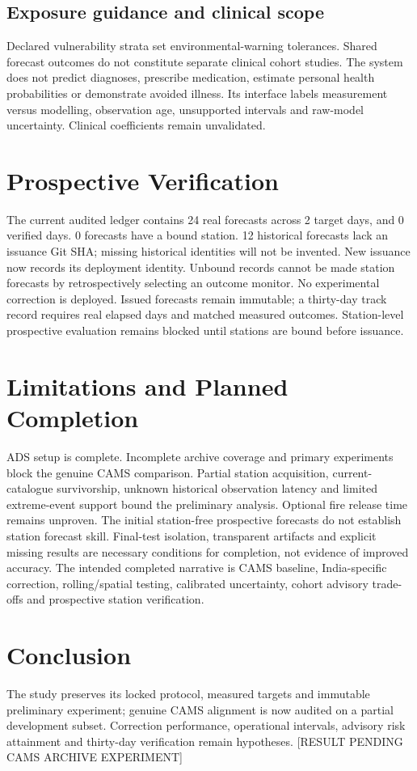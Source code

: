 \documentclass[journal]{IEEEtran}
\begin{document}
\subsection{Exposure guidance and clinical scope}
Declared vulnerability strata set environmental-warning tolerances. Shared
forecast outcomes do not constitute separate clinical cohort studies. The
system does not predict diagnoses, prescribe medication, estimate personal
health probabilities or demonstrate avoided illness. Its interface labels
measurement versus modelling, observation age, unsupported intervals and
raw-model uncertainty. Clinical coefficients remain unvalidated.
\section{Prospective Verification}
The current audited ledger contains 24 real forecasts across 2 target days, and 0 verified days. 0 forecasts have a bound station. 12 historical forecasts lack an issuance Git SHA; missing historical identities will not be invented. New issuance now records its deployment identity. Unbound records cannot be made station forecasts by retrospectively selecting an outcome monitor. No experimental correction is deployed. Issued forecasts remain immutable; a thirty-day track record requires real elapsed days and matched measured outcomes. Station-level prospective evaluation remains blocked until stations are bound before issuance.
\clearpage
\section{Limitations and Planned Completion}
ADS setup is complete. Incomplete archive coverage and primary experiments block the genuine CAMS comparison. Partial station acquisition, current-catalogue survivorship,
unknown historical observation latency and limited extreme-event support bound
the preliminary analysis. Optional fire release time remains unproven. The
initial station-free prospective forecasts do not establish station forecast
skill. Final-test isolation, transparent artifacts and explicit missing results
are necessary conditions for completion, not evidence of improved accuracy.
The intended completed narrative is CAMS baseline, India-specific correction,
rolling/spatial testing, calibrated uncertainty, cohort advisory trade-offs and
prospective station verification.
\section{Conclusion}
The study preserves its locked protocol, measured targets and immutable preliminary experiment; genuine CAMS alignment is now audited on a partial development subset. Correction performance,
operational intervals, advisory risk attainment and thirty-day verification
remain hypotheses. [RESULT PENDING CAMS ARCHIVE EXPERIMENT]
\end{document}
